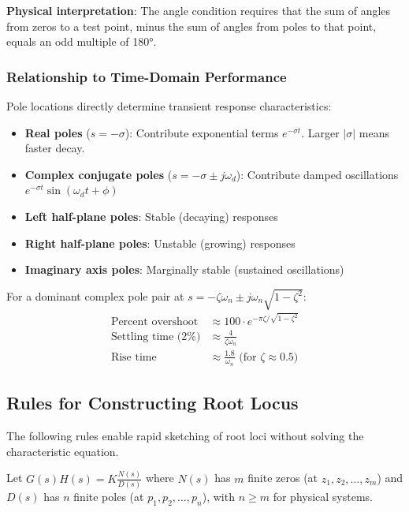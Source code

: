 \textbf{Physical interpretation}: The angle condition requires that the sum of angles from zeros to a test point, minus the sum of angles from poles to that point, equals an odd multiple of 180°.

\subsubsection{Relationship to Time-Domain Performance}

Pole locations directly determine transient response characteristics:

\begin{itemize}
    \item \textbf{Real poles} ($s = -\sigma$): Contribute exponential terms $e^{-\sigma t}$. Larger $|\sigma|$ means faster decay.

    \item \textbf{Complex conjugate poles} ($s = -\sigma \pm j\omega_d$): Contribute damped oscillations $e^{-\sigma t}\sin(\omega_d t + \phi)$

    \item \textbf{Left half-plane poles}: Stable (decaying) responses

    \item \textbf{Right half-plane poles}: Unstable (growing) responses

    \item \textbf{Imaginary axis poles}: Marginally stable (sustained oscillations)
\end{itemize}

For a dominant complex pole pair at $s = -\zeta\omega_n \pm j\omega_n\sqrt{1-\zeta^2}$:
\begin{align}
\text{Percent overshoot} &\approx 100 \cdot e^{-\pi\zeta/\sqrt{1-\zeta^2}} \\
\text{Settling time (2\%)} &\approx \frac{4}{\zeta\omega_n} \\
\text{Rise time} &\approx \frac{1.8}{\omega_n} \text{ (for } \zeta \approx 0.5\text{)}
\end{align}

\subsection{Rules for Constructing Root Locus}
\label{subsec:root_locus_rules}

The following rules enable rapid sketching of root loci without solving the characteristic equation.

Let $G(s)H(s) = K \frac{N(s)}{D(s)}$ where $N(s)$ has $m$ finite zeros (at $z_1, z_2, \ldots, z_m$) and $D(s)$ has $n$ finite poles (at $p_1, p_2, \ldots, p_n$), with $n \geq m$ for physical systems.

